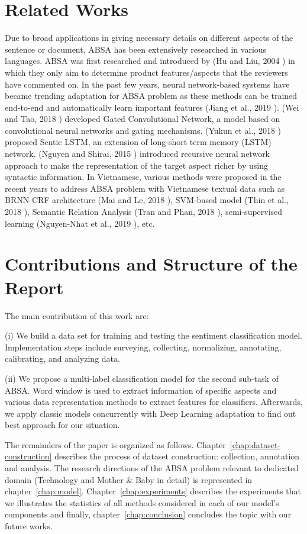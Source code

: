 \section{Related Works}
Due to broad applications in giving necessary details on different aspects of the sentence or document, ABSA has been extensively researched in various languages. ABSA was first researched and introduced by (Hu and Liu, 2004 \cite{hu2004mining}) in which they only aim to determine product features/aspects that the reviewers have commented on. In the past few years, neural network-based systems have became trending adaptation for ABSA problem as these methods can be trained end-to-end and automatically learn important features (Jiang et al., 2019 \cite{jiang2019challenge}). (Wei and Tao, 2018 \cite{xue2018aspect}) developed Gated Convolutional Network, a model based on convolutional neural networks and gating mechanisms. (Yukun et al., 2018 \cite{ma2018sentic}) proposed Sentic LSTM, an extension of long-short term memory (LSTM) network. (Nguyen and Shirai, 2015 \cite{nguyen2015phrasernn}) introduced recursive neural network approach to make the representation of the target aspect richer by using syntactic information.
In Vietnamese, various methods were proposed in the recent years to address ABSA problem with Vietnamese textual data such as BRNN-CRF architecture (Mai and Le, 2018 \cite{mai2018aspect}), SVM-based model (Thin et al., 2018 \cite{van2018transformation}), Semantic Relation Analysis (Tran and Phan, 2018 \cite{tran2018towards}), semi-supervised learning (Nguyen-Nhat et al., 2019 \cite{nguyen2019one}), etc. 



\section{Contributions and Structure of the Report}
The main contribution of this work are:

(i) We build a data set for training and testing the sentiment classification model. Implementation steps include surveying, collecting, normalizing, annotating, calibrating, and analyzing data.

(ii) We propose a multi-label classification model for the second sub-task of ABSA. Word window is used to extract information of specific aspects and various data representation methods to extract features for classifiers. Afterwards, we apply classic models concurrently with Deep Learning adaptation to find out best approach for our situation.

The remainders of the paper is organized as follows. Chapter~\ref{chap:dataset-construction} describes the process of dataset construction: collection, annotation and analysis. The research directions of the ABSA problem relevant to dedicated domain (Technology and Mother \& Baby in detail) is represented in chapter~\ref{chap:model}. Chapter~\ref{chap:experiments} describes the experiments that we illustrates the statistics of all methods considered in each of our model's components and finally, chapter~\ref{chap:conclusion} concludes the topic with our future works.